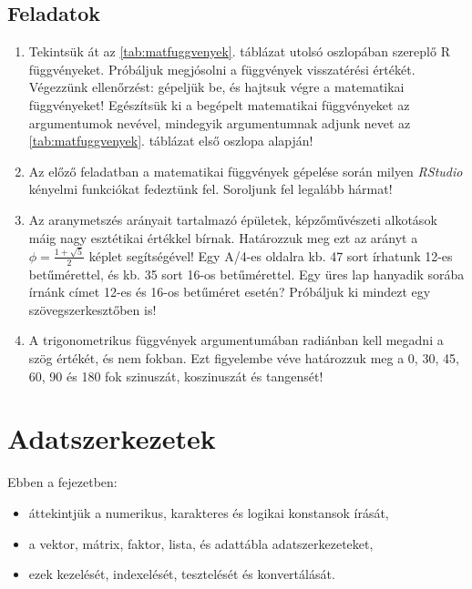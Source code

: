 \documentclass[
]{book}
\makeatletter
\providecommand{\tightlist}{%
  \setlength{\itemsep}{0pt}\setlength{\parskip}{0pt}}
\newenvironment{kframe}{%
\medskip{}
\setlength{\fboxsep}{.8em}
 \def\at@end@of@kframe{}%
 \ifinner\ifhmode%
  \def\at@end@of@kframe{\end{minipage}}%
  \begin{minipage}{\columnwidth}%
 \fi\fi%
 \def\FrameCommand##1{\hskip\@totalleftmargin \hskip-\fboxsep
 \colorbox{shadecolor}{##1}\hskip-\fboxsep
     \hskip-\linewidth \hskip-\@totalleftmargin \hskip\columnwidth}%
 \MakeFramed {\advance\hsize-\width
   \@totalleftmargin\z@ \linewidth\hsize
   \@setminipage}}%
 {\par\unskip\endMakeFramed%
 \at@end@of@kframe}
\newenvironment{rmdblock}[1]
  {
  \begin{itemize}
  \renewcommand{\labelitemi}{
    \raisebox{-.7\height}[0pt][0pt]{
      {\setkeys{Gin}{width=3em,keepaspectratio}\texttt{[image: images/\#1]}}
    }
  }
  \setlength{\fboxsep}{1em}
  \begin{kframe}
  \item
  }
  {
  \end{kframe}
  \end{itemize}
  }
\newenvironment{rmdlevel1}
  {\begin{rmdblock}{level1}}
  {\end{rmdblock}}
\newenvironment{rmdexercise}
  {\begin{rmdblock}{exercise}}
  {\end{rmdblock}}
\makeatother
\begin{document}
\hypertarget{az-r-nyelv-2-exercise}{%
\subsection{Feladatok}\label{az-r-nyelv-2-exercise}}

\begin{rmdexercise}
\begin{enumerate}
\def\labelenumi{\arabic{enumi}.}
\tightlist
\item
  Tekintsük át az \ref{tab:matfuggvenyek}. táblázat utolsó oszlopában szereplő R függvényeket. Próbáljuk megjósolni a függvények visszatérési értékét. Végezzünk ellenőrzést: gépeljük be, és hajtsuk végre a matematikai függvényeket! Egészítsük ki a begépelt matematikai függvényeket az argumentumok nevével, mindegyik argumentumnak adjunk nevet az \ref{tab:matfuggvenyek}. táblázat első oszlopa alapján!
\item
  Az előző feladatban a matematikai függvények gépelése során milyen \emph{RStudio} kényelmi funkciókat fedeztünk fel. Soroljunk fel legalább hármat!
\item
  Az aranymetszés arányait tartalmazó épületek, képzőművészeti alkotások máig nagy esztétikai értékkel bírnak. Határozzuk meg ezt az arányt a \(\phi=\frac{1+\sqrt{5}}{2}\)
  képlet segítségével! Egy A/4-es oldalra kb. 47 sort írhatunk 12-es betűmérettel, és kb. 35 sort 16-os betűmérettel. Egy üres lap hanyadik sorába írnánk címet 12-es és 16-os betűméret esetén? Próbáljuk ki mindezt egy szövegszerkesztőben is!
\item
  A trigonometrikus függvények argumentumában radiánban kell megadni a szög értékét, és nem fokban. Ezt figyelembe véve határozzuk meg a 0, 30, 45, 60, 90 és 180 fok szinuszát, koszinuszát és tangensét!
\end{enumerate}
\end{rmdexercise}

\hypertarget{adatszerkezetek}{%
\section{Adatszerkezetek}\label{adatszerkezetek}}

\begin{rmdlevel1}
Ebben a fejezetben:

\begin{itemize}
\tightlist
\item
  áttekintjük a numerikus, karakteres és logikai konstansok írását,
\item
  a vektor, mátrix, faktor, lista, és adattábla adatszerkezeteket,
\item
  ezek kezelését, indexelését, tesztelését és konvertálását.
\end{itemize}
\end{rmdlevel1}
\end{document}
